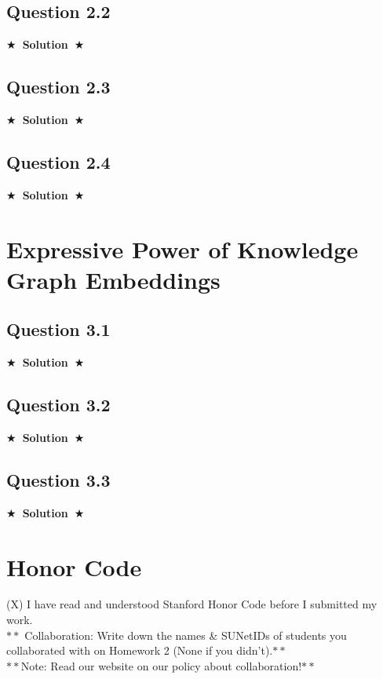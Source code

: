 \documentclass{article}
\newcommand{\Solution}[1]{{\medskip \color{black} \bf $\bigstar$~\sf \textbf{Solution}~$\bigstar$ \sf #1 } \bigskip}
\begin{document}
\subsection*{Question 2.2}
\Solution{}

\subsection*{Question 2.3}
\Solution{}

\subsection*{Question 2.4}
\Solution{}


\section{Expressive Power of Knowledge Graph Embeddings}

\subsection*{Question 3.1}
\Solution{}

\subsection*{Question 3.2}
\Solution{}

\subsection*{Question 3.3}
\Solution{}

\section{Honor Code}
(X) I have read and understood Stanford Honor Code before I submitted my work.
\\ $**$ Collaboration: Write down the names \& SUNetIDs of students you collaborated with on Homework 2 (None if you didn’t).$**$
\\ $**$Note: Read our website on our policy about collaboration!$**$
\end{document}
